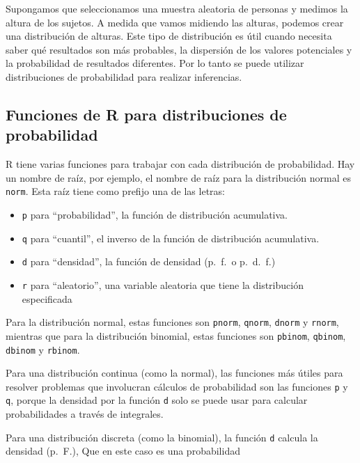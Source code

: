\documentclass[
]{book}
\providecommand{\tightlist}{%
  \setlength{\itemsep}{0pt}\setlength{\parskip}{0pt}}
\begin{document}
Supongamos que seleccionamos una muestra aleatoria de personas y medimos la altura de los sujetos. A medida que vamos midiendo las alturas, podemos crear una distribución de alturas. Este tipo de distribución es útil cuando necesita saber qué resultados son más probables, la dispersión de los valores potenciales y la probabilidad de resultados diferentes. Por lo tanto se puede utilizar distribuciones de probabilidad para realizar inferencias.

\hypertarget{funciones-de-r-para-distribuciones-de-probabilidad}{%
\subsection{Funciones de R para distribuciones de probabilidad}\label{funciones-de-r-para-distribuciones-de-probabilidad}}

R tiene varias funciones para trabajar con cada distribución de probabilidad. Hay un nombre de raíz, por ejemplo, el nombre de raíz para la distribución normal es \texttt{norm}. Esta raíz tiene como prefijo una de las letras:

\begin{itemize}
\tightlist
\item
  \texttt{p} para ``probabilidad'', la función de distribución acumulativa.
\item
  \texttt{q} para ``cuantil'', el inverso de la función de distribución acumulativa.
\item
  \texttt{d} para ``densidad'', la función de densidad (p.~f.~o p.~d.~f.)
\item
  \texttt{r} para ``aleatorio'', una variable aleatoria que tiene la distribución especificada
\end{itemize}

Para la distribución normal, estas funciones son \texttt{pnorm}, \texttt{qnorm}, \texttt{dnorm} y \texttt{rnorm}, mientras que para la distribución binomial, estas funciones son \texttt{pbinom}, \texttt{qbinom}, \texttt{dbinom} y \texttt{rbinom}.

Para una distribución continua (como la normal), las funciones más útiles para resolver problemas que involucran cálculos de probabilidad son las funciones \texttt{p} y \texttt{q}, porque la densidad por la función \texttt{d} solo se puede usar para calcular probabilidades a través de integrales.

Para una distribución discreta (como la binomial), la función \texttt{d} calcula la densidad (p.~F.), Que en este caso es una probabilidad
\end{document}
